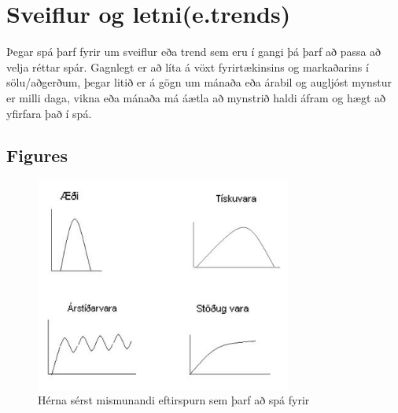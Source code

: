 %
%
%

\section {Sveiflur og letni(e.trends)}
 

Þegar spá þarf fyrir um sveiflur eða trend sem eru í gangi þá þarf að passa að velja réttar spár. Gagnlegt er að líta á vöxt fyrirtækinsins og markaðarins í sölu/aðgerðum, þegar litið er á gögn um mánaða eða árabil og augljóst mynstur er milli daga, vikna eða mánaða má áætla að mynstrið haldi áfram og hægt að yfirfara það í spá. 

\subsection{Figures}


\begin{figure}[htb]
\begin{center}

\includegraphics[width=0.75\textwidth]{tegundirspar}
\caption{Hérna sérst mismunandi eftirspurn sem þarf að spá fyrir}
\label{fig:figure1}
\end{center}
\end{figure}

